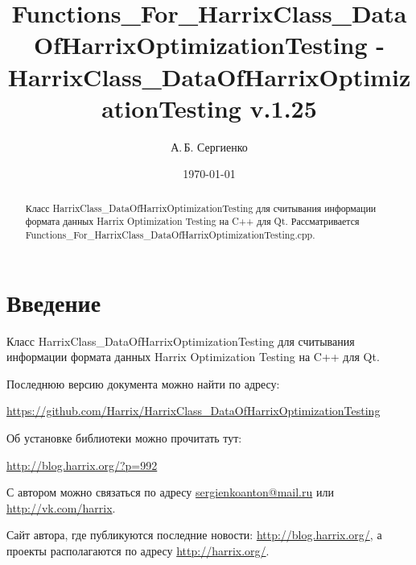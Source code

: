 \documentclass[a4paper,12pt]{article}
\title{Fu\-ncti\-ons\_For\_Har\-rix\-Class\_Da\-ta\-Of\-Har\-rix\-Opt\-im\-iz\-at\-ion\-Tes\-ting - Har\-rix\-Class\_Da\-ta\-Of\-Har\-rix\-Op\-ti\-mi\-za\-tion\-Test\-ing v.1.25}
\author{А.\,Б. Сергиенко}
\date{\today}
\begin{document}


\maketitle

\begin{abstract}
Класс HarrixClass\_DataOfHarrixOptimizationTesting для считывания информации формата данных Harrix Optimization Testing на C++ для Qt. Рассматривается Functions\_For\_HarrixClass\_DataOfHarrixOptimizationTesting.cpp.
\end{abstract}

\tableofcontents

\newpage

\section{Введение}

Класс HarrixClass\_DataOfHarrixOptimizationTesting для считывания информации формата данных Harrix Optimization Testing на C++ для Qt.

Последнюю версию документа можно найти по адресу:

\href{https://github.com/Harrix/HarrixClass\_DataOfHarrixOptimizationTesting}{https://github.com/Harrix/HarrixClass\_DataOfHarrixOptimizationTesting}

Об установке библиотеки можно прочитать тут:

\href{http://blog.harrix.org/?p=992}{http://blog.harrix.org/?p=992}

С автором можно связаться по адресу \href{mailto:sergienkoanton@mail.ru}{sergienkoanton@mail.ru} или  \href{http://vk.com/harrix}{http://vk.com/harrix}.

Сайт автора, где публикуются последние новости: \href{http://blog.harrix.org/}{http://blog.harrix.org/}, а проекты располагаются по адресу \href{http://harrix.org/}{http://harrix.org/}.

\newpage
\end{document}
